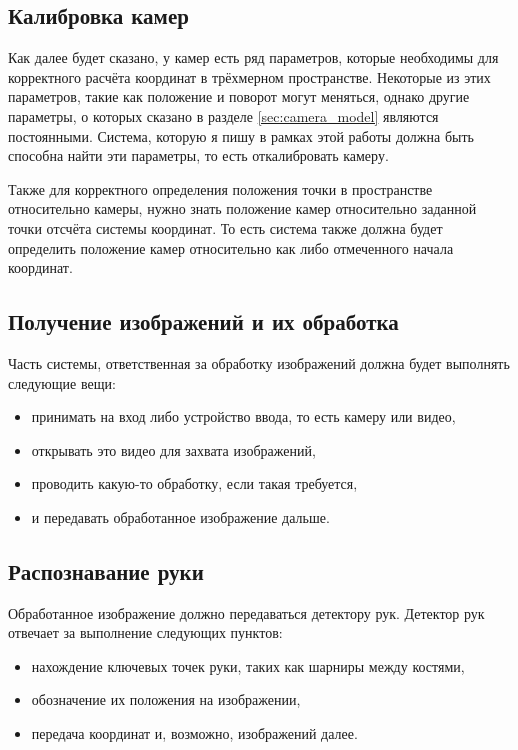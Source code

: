 \documentclass[14pt, a4paper]{extarticle}
\begin{document}
\subsection{Калибровка камер}
Как далее будет сказано, у камер есть ряд параметров, которые необходимы для
корректного расчёта координат в трёхмерном пространстве. Некоторые из этих
параметров, такие как положение и поворот могут меняться, однако другие
параметры, о которых сказано в разделе \ref{sec:camera_model} являются
постоянными.  Система, которую я пишу в рамках этой работы должна быть способна
найти эти параметры, то есть откалибровать камеру.
\par
Также для корректного определения положения точки в пространстве относительно
камеры, нужно знать положение камер относительно заданной точки отсчёта системы
координат. То есть система также должна будет определить положение камер
относительно как либо отмеченного начала координат.

\subsection{Получение изображений и их обработка}
Часть системы, ответственная за обработку изображений должна будет выполнять следующие вещи:
\begin{itemize}
    \item принимать на вход либо устройство ввода, то есть камеру или видео,
    \item открывать это видео для захвата изображений,
    \item проводить какую-то обработку, если такая требуется,
    \item и передавать обработанное изображение дальше.
\end{itemize} 

\subsection{Распознавание руки}
Обработанное изображение должно передаваться детектору рук. Детектор рук отвечает за выполнение следующих пунктов:
\begin{itemize}
    \item нахождение ключевых точек руки, таких как шарниры между костями,
    \item обозначение их положения на изображении,
    \item передача координат и, возможно, изображений далее.
\end{itemize}   
\end{document}
